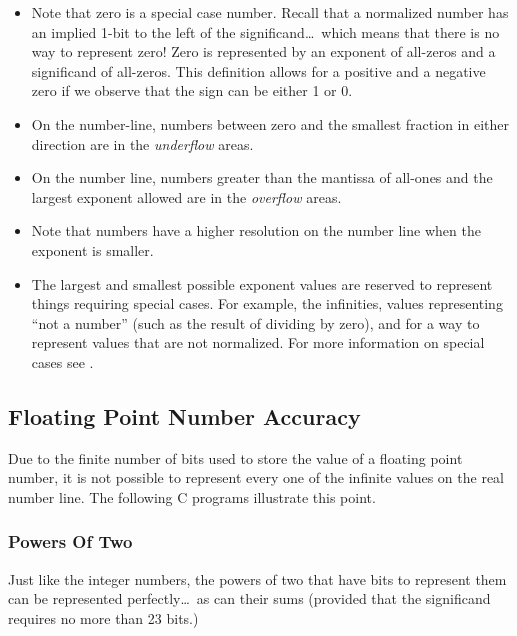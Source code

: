 \begin{itemize}
\item Note that zero is a special case number.  Recall that a normalized
number has an implied 1-bit to the left of the significand\ldots\ which
means that there is no way to represent zero!
Zero is represented by an exponent of all-zeros and a significand of
all-zeros.  This definition allows for a positive and a negative zero
if we observe that the sign can be either 1 or 0.

\item On the number-line, numbers between zero and the smallest fraction in
either direction are in the {\em \gls{underflow}} areas.

\item On the number line, numbers greater than the mantissa of all-ones and the
largest exponent allowed are in the {\em \gls{overflow}} areas.

\item Note that numbers have a higher resolution on the number line when the
exponent is smaller.

\item The largest and smallest possible exponent values are reserved to represent
things requiring special cases. For example, the infinities, values representing
``not a number'' (such as the result of dividing by zero), and for a way to represent
values that are not normalized. For more information on special cases see \cite{ieee:754}.

\end{itemize}

\subsection{Floating Point Number Accuracy}
Due to the finite number of bits used to store the value of a floating point
number, it is not possible to represent every one of the infinite values
on the real number line.  The following C programs illustrate this point.


\subsubsection{Powers Of Two}
Just like the integer numbers, the powers of two that have bits to represent
them can be represented perfectly\ldots\ as can their sums (provided that the
significand requires no more than 23 bits.)

